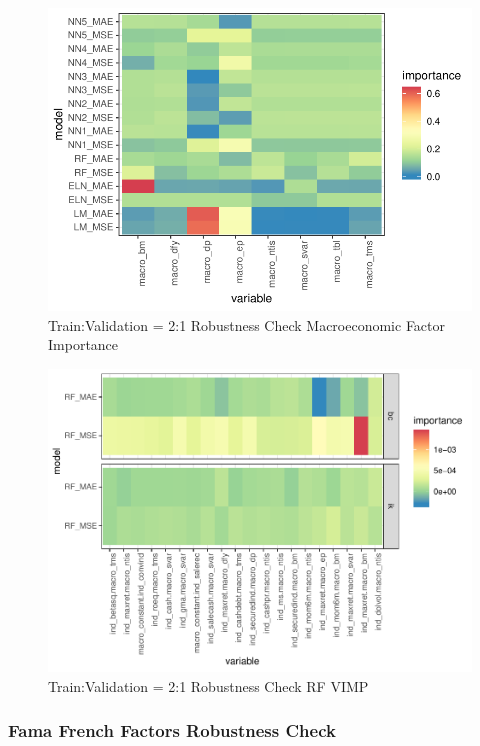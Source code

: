 \documentclass[11pt, a4paper, table]{article}
\begin{document}
\begin{figure}
	\includegraphics[]{../Results/empirical_train_valid_2/empirical_sample_all_vi_macro.pdf}
	\caption{Train:Validation = 2:1 Robustness Check Macroeconomic Factor Importance}
\end{figure}


\begin{figure}
	\includegraphics[]{../Results/empirical_train_valid_2/empirical_vimp.pdf}
	\caption{Train:Validation = 2:1 Robustness Check RF VIMP}
\end{figure}

\FloatBarrier
\subsubsection{Fama French Factors Robustness Check}
\end{document}
